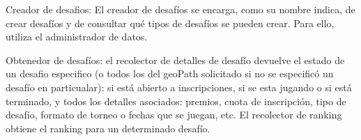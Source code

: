 
Creador de desafios: El creador de desafíos se encarga, como su nombre indica, de crear desafíos y de consultar qué tipos de desafíos se pueden crear. Para ello, utiliza el administrador de
datos.


Obtenedor de desafíos: el recolector de detalles de desafío devuelve el estado de un desafio especifico (o todos los del geoPath solicitado si no se especificó un desafío en particualar): si está abierto a inscripciones, si se esta jugando o si está terminado, y todos los detalles asociados: premios, cuota de inscripción, tipo de desafío, formato de torneo o fechas que se juegan, etc. El recolector de ranking obtiene el ranking para un determinado desafío.


